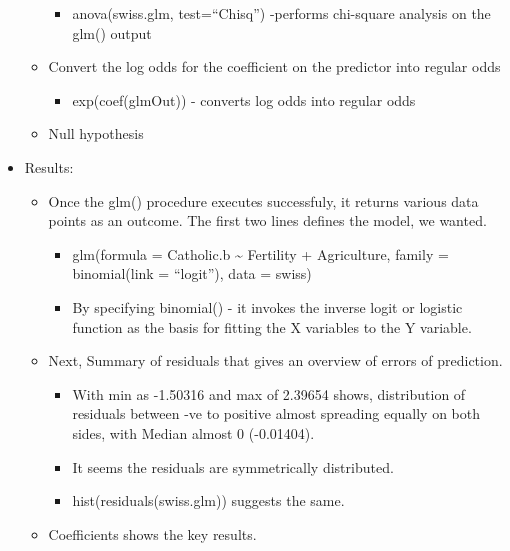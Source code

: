 \documentclass[]{article}
\providecommand{\tightlist}{%
  \setlength{\itemsep}{0pt}\setlength{\parskip}{0pt}}
\begin{document}
\begin{itemize}
\begin{itemize}
    \begin{itemize}
    \tightlist
    \item
      anova(swiss.glm, test=``Chisq'') -performs chi-square analysis on
      the glm() output
    \end{itemize}
  \item
    Convert the log odds for the coefficient on the predictor into
    regular odds

    \begin{itemize}
    \tightlist
    \item
      exp(coef(glmOut)) - converts log odds into regular odds
    \end{itemize}
  \item
    Null hypothesis
  \end{itemize}
\item
  Results:

  \begin{itemize}
  \tightlist
  \item
    Once the glm() procedure executes successfuly, it returns various
    data points as an outcome. The first two lines defines the model, we
    wanted.

    \begin{itemize}
    \tightlist
    \item
      glm(formula = Catholic.b \textasciitilde{} Fertility +
      Agriculture, family = binomial(link = ``logit''), data = swiss)
    \item
      By specifying binomial() - it invokes the inverse logit or
      logistic function as the basis for fitting the X variables to the
      Y variable.
    \end{itemize}
  \item
    Next, Summary of residuals that gives an overview of errors of
    prediction.

    \begin{itemize}
    \tightlist
    \item
      With min as -1.50316 and max of 2.39654 shows, distribution of
      residuals between -ve to positive almost spreading equally on both
      sides, with Median almost 0 (-0.01404).
    \item
      It seems the residuals are symmetrically distributed.
    \item
      hist(residuals(swiss.glm)) suggests the same.
    \end{itemize}
  \item
    Coefficients shows the key results.


\end{itemize}
\end{itemize}
\end{document}
